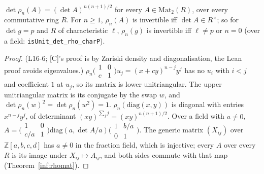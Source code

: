 \begin{lemma}\label{lem:detsym}
  \leanok
  $\det\rho_n(A)=(\det A)^{n(n+1)/2}$ for every $A\in\mathrm{Mat}_2(R)$, over every commutative ring $R$. For $n\ge1$,
  $\rho_n(A)$ is invertible iff $\det A\in R^\times$; so for $\det g=p$ and $R$ of characteristic $\ell$, $\rho_n(g)$ is
  invertible iff $\ell\ne p$ or $n=0$ (over a field: \texttt{isUnit\_det\_rho\_charP}).
\end{lemma}
\begin{proof}
  \leanok
  (L16-6; [C]'s proof is by Zariski density and diagonalisation, the Lean proof avoids eigenvalues.)
  $\rho_n\bigl(\begin{smallmatrix}1&0\\c&1\end{smallmatrix}\bigr)u_j=(x+cy)^{n-j}y^j$ has no $u_i$ with $i<j$ and
  coefficient $1$ at $u_j$, so its matrix is lower unitriangular. The upper unitriangular matrix is its conjugate by the
  swap $w$, and $\det\rho_n(w)^2=\det\rho_n(w^2)=1$. $\rho_n(\mathrm{diag}(x,y))$ is diagonal with entries
  $x^{n-j}y^j$, of determinant $(xy)^{\sum_j j}=(xy)^{n(n+1)/2}$. Over a field with $a\neq0$,
  $A=\bigl(\begin{smallmatrix}1&0\\c/a&1\end{smallmatrix}\bigr)\mathrm{diag}(a,\det A/a)
  \bigl(\begin{smallmatrix}1&b/a\\0&1\end{smallmatrix}\bigr)$. The generic matrix $(X_{ij})$ over $\mathbb Z[a,b,c,d]$
  has $a\ne0$ in the fraction field, which is injective; every $A$ over every $R$ is its image under
  $X_{ij}\mapsto A_{ij}$, and both sides commute with that map (Theorem~\ref{inf:rhomat}).
\end{proof}

